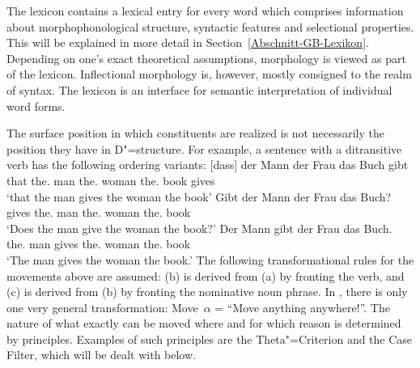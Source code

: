 The lexicon contains a lexical entry for every word which comprises information about morphophonological structure, syntactic features
and selectional properties. This will be explained in more detail in Section~\ref{Abschnitt-GB-Lexikon}. Depending on one's exact theoretical
assumptions, morphology is viewed as part of the lexicon. Inflectional morphology is, however, mostly consigned
to the realm of syntax. The lexicon is an interface for semantic interpretation of individual word forms.

\addlines
The surface position in which constituents are realized is not necessarily the position they have in
D"=structure. For example, a sentence with a ditransitive verb has the following ordering variants:
\eal
\ex 
\gll {}[dass] der Mann der Frau das Buch gibt\\
	 {}\spacebr{}that the.\nom{} man the.\dat{} woman the.\acc{} book gives\\
\glt `that the man gives the woman the book'
\ex 
\gll Gibt der Mann der Frau das Buch?\\
	 gives the.\nom{} man the.\dat{} woman the.\acc{} book\\
\glt `Does the man give the woman the book?'
\ex 
\gll Der Mann gibt der Frau das Buch.\\
	 the.\nom{} man gives the.\dat{} woman the.\acc{} book\\
\glt `The man gives the woman the book.'
\zl
The following transformational rules for the movements above are assumed: (b) is derived from (a) by fronting the verb, 
and (c) is derived from (b) by fronting the nominative noun phrase. In \gbt, there is only one very general transformation:
Move~$\alpha$ = ``Move anything anywhere!''. The nature of what exactly can be moved where and for which reason is determined
by principles. Examples of such principles are the Theta"=Criterion and the Case Filter, which will be
dealt with below.

